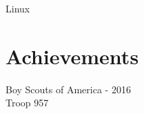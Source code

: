 \documentclass[letterpaper]{deedy-resume} %
\begin{document}
\begin{minipage}[t]{0.33\textwidth}
\textbullet{} Linux\\

\sectionspace %



\section{Achievements}

Boy Scouts of America - 2016 \\
Troop 957


\end{minipage} %
\hfill
%
%
\end{document}
